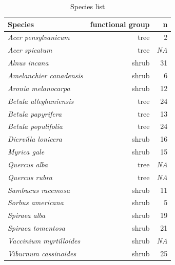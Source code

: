 \documentclass{article}[12pt]
\begin{document}
\clearpage
\begin{table}[ht]
\centering
\caption{Species list} 
\label{listSp}
\begin{tabular}{lrr}
  \hline
Species & functional group & n \\ 
  \hline
  \emph{Acer pensylvanicum} & tree  & 2 \\ 
  \emph{Acer spicatum} & tree & \emph{NA}  \\ 
   \emph{Alnus incana} & shrub & 31 \\ 
   \emph{Amelanchier canadensis} &  shrub & 6  \\ 
  \emph{Aronia melanocarpa} & shrub & 12 \\ 
  \emph{Betula alleghaniensis} &  tree & 24\\ 
  \emph{Betula papyrifera} &   tree & 13 \\ 
  \emph{Betula populifolia} &  tree & 24\\ 
  \emph{Diervilla lonicera} &  shrub  & 16 \\ 
  \emph{Myrica gale} &  shrub & 15\\ 
  \emph{Quercus alba} &  tree & \emph{NA}\\ 
  \emph{Quercus rubra} &  tree & \emph{NA}\\ 
  \emph{Sambucus racemosa} &  shrub & 11\\ 
  \emph{Sorbus americana} &  shrub & 5\\
  \emph{Spiraea alba} &  shrub & 19\\ 
  \emph{Spiraea tomentosa} &   shrub & 21 \\ 
  \emph{Vaccinium myrtilloides} &  shrub & \emph{NA}\\ 
  \emph{Viburnum cassinoides} &  shrub & 25 \\ 
  \end{tabular}
\end{table}


\newpage

\end{document}
